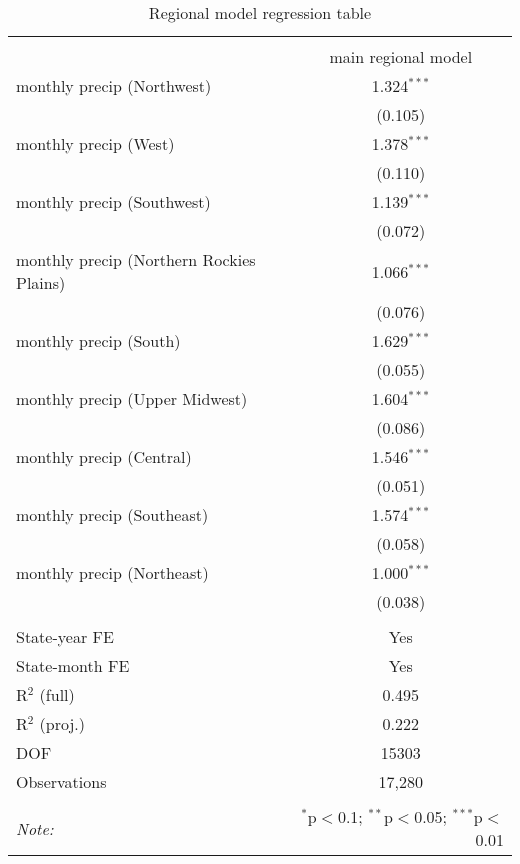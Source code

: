
\begin{table}[!htbp] \centering 
  \caption{Regional model regression table} 
  \label{} 
\scriptsize 
\begin{tabular}{@{\extracolsep{2pt}}lc} 
\\[-1.8ex]\hline 
\hline \\[-1.8ex] 
 & main regional model \\ 
 monthly precip (Northwest) & 1.324$^{***}$ \\ 
  & (0.105) \\ 
  monthly precip (West) & 1.378$^{***}$ \\ 
  & (0.110) \\ 
  monthly precip (Southwest) & 1.139$^{***}$ \\ 
  & (0.072) \\ 
  monthly precip (Northern Rockies Plains) & 1.066$^{***}$ \\ 
  & (0.076) \\ 
  monthly precip (South) & 1.629$^{***}$ \\ 
  & (0.055) \\ 
  monthly precip (Upper Midwest) & 1.604$^{***}$ \\ 
  & (0.086) \\ 
  monthly precip (Central) & 1.546$^{***}$ \\ 
  & (0.051) \\ 
  monthly precip (Southeast) & 1.574$^{***}$ \\ 
  & (0.058) \\ 
  monthly precip (Northeast) & 1.000$^{***}$ \\ 
  & (0.038) \\ 
 \hline \\[-1.8ex] 
State-year FE & Yes \\ 
State-month FE & Yes \\ 
R$^2$ (full) & 0.495 \\ 
R$^2$ (proj.) & 0.222 \\ 
DOF & 15303 \\ 
Observations & 17,280 \\ 
\hline 
\hline \\[-1.8ex] 
\textit{Note:}  & \multicolumn{1}{r}{$^{*}$p$<$0.1; $^{**}$p$<$0.05; $^{***}$p$<$0.01} \\ 
\end{tabular} 
\end{table} 
